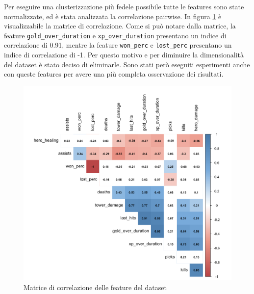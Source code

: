 \documentclass[a4paper,12pt,openany,oneside]{book}
\begin{document}
Per eseguire una clusterizzazione più fedele possibile tutte le features sono state normalizzate, ed è stata analizzata la correlazione pairwise. In figura \ref{fig:cor-mat} è visualizzabile la matrice di correlazione. Come si può notare dalla matrice, la feature \verb|gold_over_duration| e \verb|xp_over_duration| presentano un indice di correlazione di 0.91, mentre la feature \verb|won_perc| e \verb|lost_perc| presentano un indice di correlazione di -1. Per questo motivo e per diminuire la dimensionalità del dataset è stato deciso di eliminarle. Sono stati però eseguiti esperimenti anche con queste features per avere una più completa osservazione dei risultati.

\begin{figure}[H]
	\includegraphics[width=\linewidth]{pics/corr_mat.png}
	\caption{Matrice di correlazione delle feature del dataset}
	\label{fig:cor-mat}
\end{figure}
\end{document}
